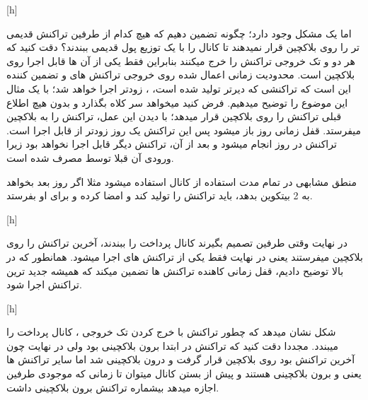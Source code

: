 [h]

اما یک مشکل وجود دارد؛ چگونه تضمین دهیم که هیچ کدام از طرفین تراکنش قدیمی تر  را روی بلاکچین قرار نمیدهند تا کانال را با یک توزیع پول قدیمی ببندند؟ دقت کنید که هر دو  و  تک خروجی تراکنش  را خرج میکنند بنابراین فقط یکی از آن ها قابل اجرا روی بلاکچین است. محدودیت زمانی اعمال شده روی خروجی تراکنش های  و  تضمین کننده این است که تراکنشی که دیرتر تولید شده است، ، زودتر اجرا خواهد شد؛ با یک مثال این موضوع را توضیح میدهیم. فرض کنید  میخواهد سر  کلاه بگذارد و بدون هیچ اطلاع قبلی تراکنش  را روی بلاکچین قرار میدهد؛  با دیدن این عمل، تراکنش    را به بلاکچین میفرستد. قفل زمانی   روز  باز میشود پس این تراکنش یک روز زودتر از  قابل اجرا است. تراکنش   در روز  انجام میشود و بعد از آن، تراکنش  دیگر قابل اجرا نخواهد بود زیرا ورودی آن قبلا توسط   مصرف شده است.

منطق مشابهی در تمام مدت استفاده از کانال استفاده میشود مثلا اگر روز بعد  بخواهد به  2 بیتکوین بدهد، باید تراکنش  را تولید کند و امضا کرده و برای او بفرستد.

[h]

در نهایت وقتی طرفین تصمیم بگیرند کانال پرداخت را ببندند، آخرین تراکنش را روی بلاکچین میفرستند یعنی در نهایت فقط یکی از تراکنش های     اجرا میشود. همانطور که در بالا توضیح دادیم، قفل زمانی کاهنده تراکنش ها تضمین میکند که همیشه جدید ترین تراکنش اجرا شود.

[h]

شکل  نشان میدهد که چطور تراکنش  با خرج کردن تک خروجی ، کانال پرداخت را میبندد. مجددا دقت کنید که تراکنش   در ابتدا برون بلاکچینی بود ولی در نهایت چون آخرین تراکنش بود روی بلاکچین قرار گرفت و درون بلاکچینی شد اما سایر تراکنش ها یعنی  و  برون بلاکچینی هستند و پیش از بستن کانال میتوان تا زمانی که موجودی طرفین اجازه میدهد بیشماره تراکنش برون بلاکچینی داشت.



